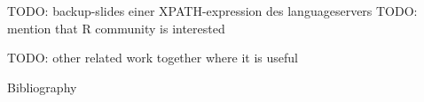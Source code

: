 


\titleframe











\begin{frame}
   TODO: backup-slides einer XPATH-expression des languageservers
   TODO: mention that R community is interested
\end{frame}
\begin{frame}
TODO: other related work together where it is useful
\end{frame}




\begin{frame}{Bibliography}
   \printBibCommand
\end{frame}

